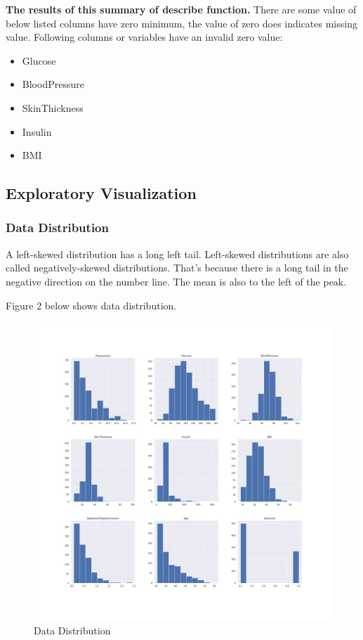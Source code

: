 \documentclass[
]{article}
\providecommand{\tightlist}{%
  \setlength{\itemsep}{0pt}\setlength{\parskip}{0pt}}
\begin{document}
\textbf{The results of this summary of describe function.} There are
some value of below listed columns have zero minimum, the value of zero
does indicates missing value. Following columns or variables have an
invalid zero value:

\begin{itemize}
\tightlist
\item
  Glucose
\item
  BloodPressure
\item
  SkinThickness
\item
  Insulin
\item
  BMI
\end{itemize}

\hypertarget{exploratory-visualization}{%
\subsection{Exploratory Visualization}\label{exploratory-visualization}}

\hypertarget{data-distribution}{%
\subsubsection{Data Distribution}\label{data-distribution}}

A left-skewed distribution has a long left tail. Left-skewed
distributions are also called negatively-skewed distributions. That's
because there is a long tail in the negative direction on the number
line. The mean is also to the left of the peak.

Figure 2 below shows data distribution.

\begin{figure}
\centering
\includegraphics{clean.jpg}
\caption{Data Distribution}
\end{figure}
\end{document}
